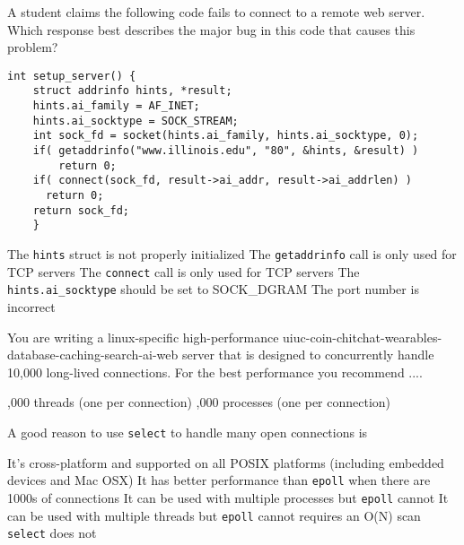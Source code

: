 \variant
A student claims the following code fails to connect to a remote web server. 
Which response best describes the major bug in this code that causes this problem?
\begin{verbatim}
int setup_server() {
    struct addrinfo hints, *result;
    hints.ai_family = AF_INET;
    hints.ai_socktype = SOCK_STREAM; 
    int sock_fd = socket(hints.ai_family, hints.ai_socktype, 0);
    if( getaddrinfo("www.illinois.edu", "80", &hints, &result) ) 
        return 0;
    if( connect(sock_fd, result->ai_addr, result->ai_addrlen) )
      return 0;
    return sock_fd;
    }
\end{verbatim}
\begin{answers}
\correctanswer The {\tt hints} struct is not properly initialized 
\answer The {\tt getaddrinfo} call is only used for TCP servers
\answer The {\tt connect} call is only used for TCP servers
\answer The {\tt hints.ai_socktype} should be set to SOCK_DGRAM
\answer The port number is incorrect
\end{answers}
\begin{solution}
\end{solution}

\variant
You are writing a linux-specific high-performance uiuc-coin-chitchat-wearables-database-caching-search-ai-web server that is designed to concurrently handle 10,000 long-lived connections. For the best performance you recommend ....
\begin{answers}
,000 threads (one per connection)
,000 processes (one per connection)
\end{answers}
\begin{solution}
\end{solution}


\variant
A good reason to use {\tt select} to handle many open connections is 
\begin{answers}
\correctanswer It's cross-platform and supported on all POSIX platforms (including embedded devices and Mac OSX)
\answer It has better performance than {\tt epoll} when there are 1000s of connections
\answer It can be used with multiple processes but {\tt epoll} cannot
\answer It can be used with multiple threads but {\tt epoll} cannot
 requires an O(N) scan {\tt select} does not
\end{answers}
\begin{solution}
\end{solution}


